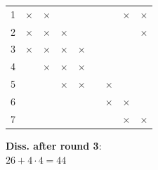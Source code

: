 \documentclass[a4paper, 10pt]{article}
\begin{document}
\begin{table}[htbp]
\begin{minipage}{0.42\linewidth}
{\begin{tabular}{c | c c c c c c c c}
			1 & $\times$ & $\times$ &          &          &   &          & $\times$ & $\times$ \\
			2 & $\times$ & $\times$ & $\times$ &          &   &          &          & $\times$ \\
			3 & $\times$ & $\times$ & $\times$ & $\times$ &   &          &          &          \\
			4 &          & $\times$ & $\times$ & $\times$ &   &          &          &          \\
			5 &          &          & $\times$ & $\times$ &   & $\times$ &          &          \\
			6 &          &          &          &          &   & $\times$ & $\times$ &          \\
			7 &          &          &          &          &   &          & $\times$ & $\times$ \\
		\end{tabular}
	}
\end{minipage}
\begin{minipage}{0.42\linewidth}
	\vspace{0.3cm}
	\textbf{Diss. after round 3}: \\
	$26 + 4 \cdot 4 = 44$ \\
	\vspace{-0.1cm} \\
\end{minipage}
\end{table}
\end{document}
